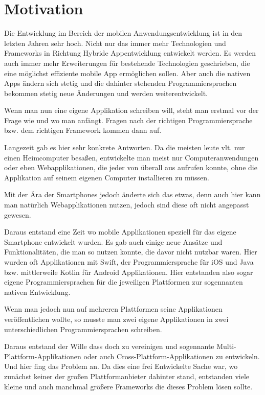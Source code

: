 \chapter{Motivation}




Die Entwicklung im Bereich der mobilen Anwendungsentwicklung ist in den letzten Jahren sehr hoch. Nicht nur das immer mehr Technologien und Frameworks in Richtung Hybride Appentwicklung entwickelt werden. Es werden auch immer mehr Erweiterungen für bestehende Technologien geschrieben, die eine möglichst effiziente mobile App ermöglichen sollen. Aber auch die nativen Apps ändern sich stetig und die dahinter stehenden Programmiersprachen bekommen stetig neue Änderungen und werden weiterentwickelt.

Wenn man nun eine eigene Applikation schreiben will, steht man erstmal vor der Frage wie und wo man anfängt.
Fragen nach der richtigen Programmiersprache bzw. dem richtigen Framework kommen dann auf.

Langezeit gab es hier sehr konkrete Antworten. Da die meisten leute vlt. nur einen Heimcomputer besaßen, entwickelte man meist nur Computeranwendungen oder eben Webapplikationen, die jeder von überall aus aufrufen konnte, ohne die Applikation auf seinem eigenen Computer installieren zu müssen.

Mit der Ära der Smartphones jedoch änderte sich das etwas, denn auch hier kann man natürlich Webapplikationen nutzen, jedoch sind diese oft nicht angepasst gewesen.

Daraus entstand eine Zeit wo mobile Applikationen speziell für das eigene Smartphone entwickelt wurden. Es gab auch einige neue Ansätze und Funktionalitäten, die man so nutzen konnte, die davor nicht nutzbar waren. Hier wurden oft Applikationen mit Swift, der Programmiersprache für iOS und Java bzw. mittlerweile Kotlin für Android Applikationen. Hier entstanden also sogar eigene Programmiersprachen für die jeweiligen Plattformen zur sogennanten nativen Entwicklung.

Wenn man jedoch nun auf mehreren Plattformen seine Applikationen veröffentlichen wollte, so musste man zwei eigene Applikationen in zwei unterschiedlichen Programmiersprachen schreiben. 

Daraus entstand der Wille dass doch zu vereinigen und 
sogennante Multi-Plattform-Applikationen oder auch Cross-Plattform-Applikationen zu entwickeln.
Und hier fing das Problem an. Da dies eine frei Entwickelte Sache war, wo zunächst keiner der großen Plattformanbieter dahinter stand, entstanden viele kleine und auch manchmal größere Frameworks die dieses Problem lösen sollte.

